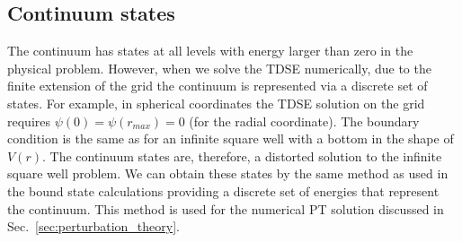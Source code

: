 \subsection{Continuum states} %
\label{sub:continuum_states}
The continuum has states at all levels with energy larger than zero in the physical problem. However, when we solve the TDSE numerically, due to the finite extension of the grid the continuum is represented via a discrete set of states. For example, in spherical coordinates the TDSE solution on the grid requires $\psi(0) = \psi(r_{max}) = 0$ (for the radial coordinate). The boundary condition is the same as for an infinite square well with a bottom in the shape of $V(r)$. The continuum states are, therefore, a distorted solution to the infinite square well problem. We can obtain these states by the same method as used in the bound state calculations providing a discrete set of energies that represent the continuum. This method is used for the numerical PT solution discussed in Sec.~\ref{sec:perturbation_theory}.

